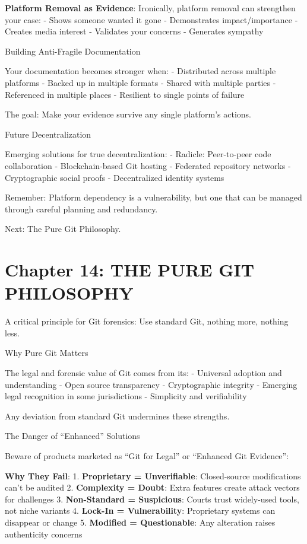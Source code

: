 \textbf{Platform Removal as Evidence}: Ironically, platform removal can
strengthen your case: - Shows someone wanted it gone - Demonstrates
impact/importance - Creates media interest - Validates your concerns -
Generates sympathy

Building Anti-Fragile Documentation

Your documentation becomes stronger when: - Distributed across multiple
platforms - Backed up in multiple formats - Shared with multiple parties
- Referenced in multiple places - Resilient to single points of failure

The goal: Make your evidence survive any single platform's actions.

Future Decentralization

Emerging solutions for true decentralization: - Radicle: Peer-to-peer
code collaboration - Blockchain-based Git hosting - Federated repository
networks - Cryptographic social proofs - Decentralized identity systems

Remember: Platform dependency is a vulnerability, but one that can be
managed through careful planning and redundancy.

Next: The Pure Git Philosophy.

\section{Chapter 14: THE PURE GIT
PHILOSOPHY}\label{chapter-14-the-pure-git-philosophy}

A critical principle for Git forensics: Use standard Git, nothing more,
nothing less.

Why Pure Git Matters

The legal and forensic value of Git comes from its: - Universal adoption
and understanding - Open source transparency - Cryptographic integrity -
Emerging legal recognition in some jurisdictions - Simplicity and
verifiability

Any deviation from standard Git undermines these strengths.

The Danger of ``Enhanced'' Solutions

Beware of products marketed as ``Git for Legal'' or ``Enhanced Git
Evidence'':

\textbf{Why They Fail}: 1. \textbf{Proprietary = Unverifiable}:
Closed-source modifications can't be audited 2. \textbf{Complexity =
Doubt}: Extra features create attack vectors for challenges 3.
\textbf{Non-Standard = Suspicious}: Courts trust widely-used tools, not
niche variants 4. \textbf{Lock-In = Vulnerability}: Proprietary systems
can disappear or change 5. \textbf{Modified = Questionable}: Any
alteration raises authenticity concerns

